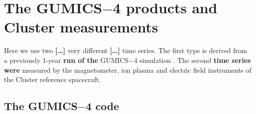 \documentclass[linenumbers,draft]{agujournal}
\begin{document}
\section{The GUMICS$-$4 products and Cluster measurements}
\label{sec:data}

Here we use two \textbf{[\dots]} very different \textbf{[\dots]} time series. The first type is derived from a previously 1-year \textbf{run of the} GUMICS$-$4 simulation \citep{facsko16:_one_earth}. The second \textbf{time series were} measured by the magnetometer, ion plasma and electric field instruments of the Cluster reference spacecraft.

\subsection{The GUMICS$-$4 code}
\label{sec:gumics}
\end{document}
